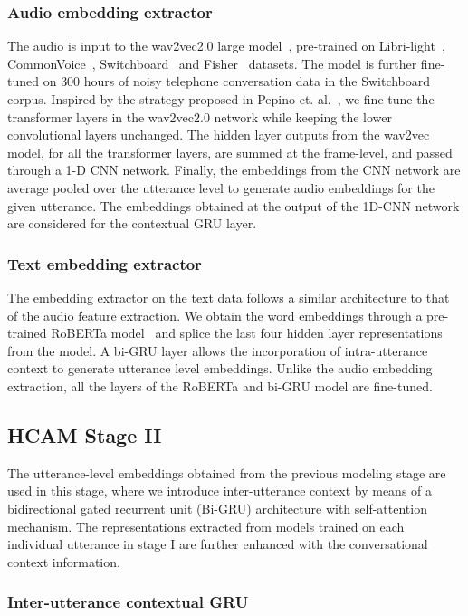 \documentclass[lettersize,journal]{IEEEtran}
\begin{document}
\subsubsection{Audio embedding extractor}\label{audfeat}
The audio is input to the wav2vec2.0 large model~\cite{baevski2020wav2vec}, pre-trained on Libri-light~\cite{kahn2020libri}, CommonVoice~\cite{ardila2020common}, Switchboard~\cite{godfrey1992switchboard} and Fisher~\cite{cieri2004fisher} datasets. The model is further fine-tuned on $300$ hours of noisy telephone conversation data in the Switchboard corpus. 
Inspired by the strategy proposed in Pepino et. al.~\cite{pepino2021emotion}, we fine-tune the transformer layers in the wav2vec2.0 network while keeping the lower convolutional layers unchanged. The hidden layer outputs from the wav2vec model, for all the transformer layers, are summed at the frame-level, and passed through a 1-D CNN network. 
  Finally, the embeddings from the CNN network are average pooled over the utterance level to generate audio embeddings for the given utterance.
 The embeddings obtained at the output of the 1D-CNN network are considered for the contextual GRU layer.
\subsubsection{Text embedding extractor}\label{textfeat}
The embedding extractor on the text data follows a similar architecture to that of the audio feature extraction. We obtain the word embeddings through a pre-trained RoBERTa model~\cite{liu2019roberta} and splice the last four hidden layer representations from the model. A bi-GRU layer allows the incorporation of intra-utterance context to generate utterance level embeddings.  Unlike the audio embedding  extraction, all the layers of the RoBERTa and bi-GRU model are fine-tuned. 
\subsection{HCAM Stage II}\label{stage2}
The utterance-level embeddings obtained from the previous modeling stage are used in this stage, where we introduce inter-utterance context by means of a bidirectional gated recurrent unit (Bi-GRU) architecture with self-attention mechanism. The representations  extracted from models trained on each individual utterance in stage I are further enhanced with the conversational context information. 
\subsubsection{Inter-utterance contextual GRU}\label{context}
\end{document}
